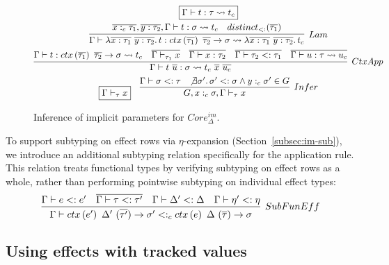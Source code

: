 \documentclass[acmsmall,review,screen]{acmart}
\newcommand{\mathframebox}[1]{\framebox{$\displaystyle #1$}}
\newcommand{\ap}{~}
\newcommand{\ctx}[1]{ctx\left(#1\right)~}
\newcommand{\step}{\rightsquigarrow}
\begin{document}
\begin{figure}
    \begin{gather*}
        \mathframebox{\Gamma\vdash t : \tau \step t_{c}} \\
        \infer[Lam]{
            \Gamma\vdash \lambda \overline{x : \tau_1} ~ \overline{y : \tau_2} \ldotp t : \ctx{\overline{\tau_1}} \overline{\tau_2} \to \sigma \step \lambda \overline{x : \tau_1} ~ \overline{y : \tau_2} \ldotp t_c
        }{
            \overline{x :_c \tau_1}, \overline{y : \tau_2}, \Gamma\vdash t : \sigma \step t_c &
            distinct_{<:}(\overline{\tau_1})
        } \\
        \infer[CtxApp]{
            \Gamma\vdash t\ap\overline{u} : \sigma \step t_{c} \ap \overline{x}\ap\overline{u_{c}}
        }{
            \Gamma\vdash t : \ctx{\overline{\tau_1}} \overline{\tau_2} \to \sigma \step t_{c} &
            \overline{\Gamma\vdash_{\tau_1} x} &
            \overline{\Gamma\vdash x : \tau_2} &
            \overline{\Gamma\vdash \tau_2 <: \tau_1} &
            \overline{\Gamma\vdash u : \tau \step u_{c}}
        } \\
        \begin{array}{cc}
            \mathframebox{\Gamma\vdash_\tau x} &
            \infer[Infer]{
                G, x :_c \sigma, \Gamma\vdash_{\tau} x
            }{
                \Gamma\vdash\sigma <: \tau &
                \not\exists \sigma'\ldotp \sigma' <: \sigma \land y :_c \sigma' \in G
            }
        \end{array}
    \end{gather*}
    \caption{Inference of implicit parameters for $Core_\Delta^{im}$.}
    \label{fig:core-im-delta-core-implicit-inference}
\end{figure}

To support subtyping on effect rows via $\eta$-expansion (Section~\ref{subsec:im-sub}), we introduce an additional subtyping relation specifically for the application rule.
This relation treats functional types by verifying subtyping on effect rows as a whole, rather than performing pointwise subtyping on individual effect types:
\[
    \infer[SubFunEff]{
        \Gamma\vdash \ctx{e'} \Delta' ~ (\overline{\tau'})\to \sigma' <:_c \ctx{e} \Delta ~ (\overline{\tau})\to \sigma
    }{
        \Gamma\vdash e <: e' & \overline{\Gamma\vdash \tau <: \tau'} & \Gamma\vdash\Delta' <: \Delta & \Gamma\vdash \eta' <: \eta
    }
\]

\subsection{Using effects with tracked values} \label{subsec:relax-tracked}
\end{document}
